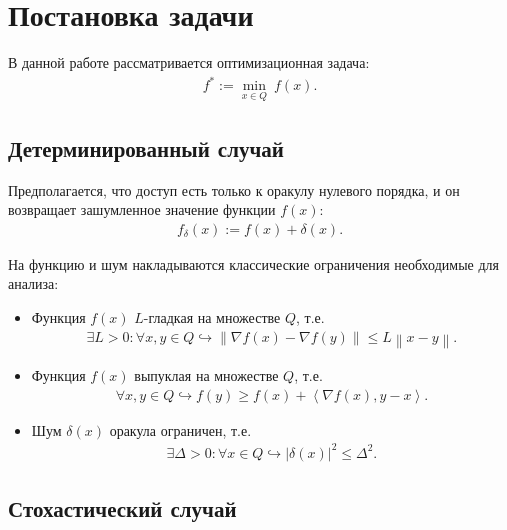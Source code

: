 \section{Постановка задачи}

    В данной работе рассматривается оптимизационная задача:
    \begin{align} \label{eq:problem_nonstoch}
        f^* := \min\limits_{x \in Q}\ f(x).
    \end{align}

\subsection{Детерминированный случай}
    
    Предполагается, что доступ есть только к оракулу нулевого порядка, и он возвращает зашумленное значение функции $f(x)$:
    \begin{align*}
        f_\delta (x) := f(x) + \delta(x).
    \end{align*}

    На функцию и шум накладываются классические ограничения необходимые для анализа:
    \begin{itemize}
        \item Функция $f (x)$ $L$-гладкая на множестве $Q$, т.е.
        \begin{align} \label{ass:smooth_nonstoch}
            \exists L > 0 : \forall x, y \in Q \hookrightarrow \left\| \nabla f(x) - \nabla f(y) \right\| \leq L \left\| x - y \right\|.
        \end{align}
        \item Функция $f(x)$ выпуклая на множестве $Q$, т.е.
        \begin{align} \label{ass:conv_nonstoch}
            \forall x, y \in Q \hookrightarrow f(y) \geq f(x) + \left< \nabla f(x), y - x \right>.
        \end{align}
        \item Шум $\delta(x)$ оракула ограничен, т.е.
        \begin{align} \label{ass:bounded_nonstoch}
            \exists \Delta > 0 : \forall x \in Q \hookrightarrow |\delta(x)|^2 \leq \Delta^2.
        \end{align}
    \end{itemize}

\subsection{Стохастический случай}

